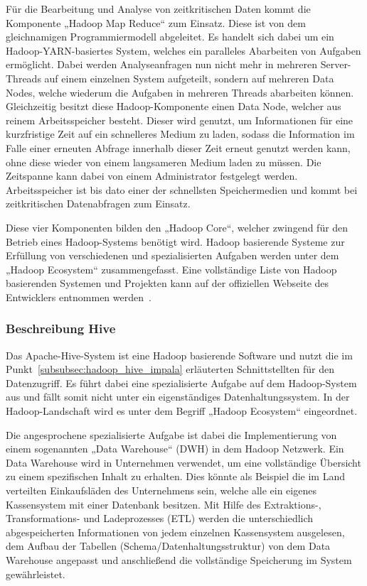 Für die Bearbeitung und Analyse von zeitkritischen Daten kommt die Komponente
„Hadoop Map Reduce“ zum Einsatz. Diese ist von dem gleichnamigen
Programmiermodell abgeleitet. Es handelt sich dabei um ein
Hadoop-YARN-basiertes System, welches ein paralleles Abarbeiten von Aufgaben
ermöglicht.  Dabei werden Analyseanfragen nun nicht mehr in mehreren
Server-Threads auf einem einzelnen System aufgeteilt, sondern auf mehreren Data
Nodes, welche wiederum die Aufgaben in mehreren Threads abarbeiten können.
Gleichzeitig besitzt diese Hadoop-Komponente einen Data Node, welcher aus
reinem Arbeitsspeicher besteht. Dieser wird genutzt, um Informationen für eine
kurzfristige Zeit auf ein schnelleres Medium zu laden, sodass die Information
im Falle einer erneuten Abfrage innerhalb dieser Zeit erneut genutzt werden
kann, ohne diese wieder von einem langsameren Medium laden zu müssen. Die
Zeitspanne kann dabei von einem Administrator festgelegt werden.
Arbeitsspeicher ist bis dato einer der schnellsten Speichermedien und kommt bei
zeitkritischen Datenabfragen zum Einsatz.

Diese vier Komponenten bilden den „Hadoop Core“, welcher zwingend für den
Betrieb eines Hadoop-Systems benötigt wird. Hadoop basierende Systeme zur
Erfüllung von verschiedenen und spezialisierten Aufgaben werden unter dem
„Hadoop Ecosystem“ zusammengefasst. Eine vollständige Liste von
Hadoop basierenden Systemen und Projekten kann auf der offiziellen Webseite des
Entwicklers entnommen werden~\cite{Hadoop_related_projects}.
\nl%

\subsubsection{Beschreibung Hive}
\label{subsubsec:hadoop_beschreibung}
Das Apache-Hive-System ist eine Hadoop basierende Software und nutzt die im
Punkt~\ref{subsubsec:hadoop_hive_impala} erläuterten Schnittstellten für den
Datenzugriff. Es führt dabei eine spezialisierte Aufgabe auf dem Hadoop-System
aus und fällt somit nicht unter ein eigenständiges Datenhaltungssystem. In der
Hadoop-Landschaft wird es unter dem Begriff „Hadoop Ecosystem“ eingeordnet.

Die angesprochene spezialisierte Aufgabe ist dabei die Implementierung von
einem sogenannten „Data Warehouse“ (DWH) in dem Hadoop Netzwerk. Ein Data
Warehouse wird in Unternehmen verwendet, um eine vollständige Übersicht zu
einem spezifischen Inhalt zu erhalten. Dies könnte als Beispiel die im Land
verteilten Einkaufsläden des Unternehmens sein, welche alle ein eigenes
Kassensystem mit einer Datenbank besitzen. Mit Hilfe des Extraktions-,
Transformations- und Ladeprozesses (ETL) werden die unterschiedlich
abgespeicherten Informationen von jedem einzelnen Kassensystem ausgelesen, dem
Aufbau der Tabellen (Schema/Datenhaltungsstruktur) von dem Data Warehouse
angepasst und anschließend die vollständige Speicherung im System
gewährleistet.


